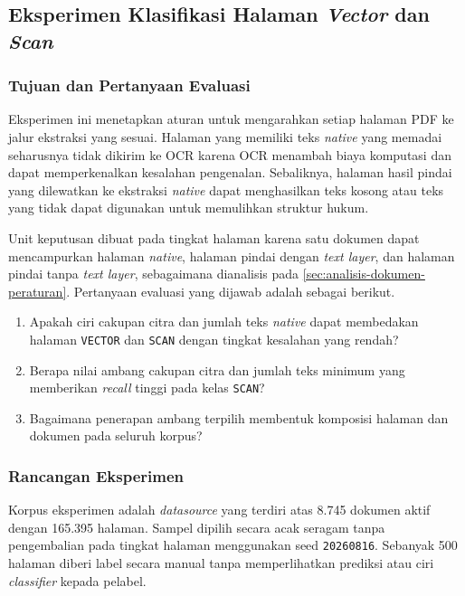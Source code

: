 \subsection{Eksperimen Klasifikasi Halaman \textit{Vector} dan \textit{Scan}}
\label{sec:eksperimen-klasifikasi-halaman}

\subsubsection{Tujuan dan Pertanyaan Evaluasi}
\label{sec:tujuan-evaluasi-klasifikasi-halaman}

Eksperimen ini menetapkan aturan untuk mengarahkan setiap halaman PDF ke jalur ekstraksi yang sesuai.
Halaman yang memiliki teks \textit{native} yang memadai seharusnya tidak dikirim ke OCR karena OCR menambah biaya komputasi dan dapat memperkenalkan kesalahan pengenalan.
Sebaliknya, halaman hasil pindai yang dilewatkan ke ekstraksi \textit{native} dapat menghasilkan teks kosong atau teks yang tidak dapat digunakan untuk memulihkan struktur hukum.

Unit keputusan dibuat pada tingkat halaman karena satu dokumen dapat mencampurkan halaman \textit{native}, halaman pindai dengan \textit{text layer}, dan halaman pindai tanpa \textit{text layer}, sebagaimana dianalisis pada \autoref{sec:analisis-dokumen-peraturan}.
Pertanyaan evaluasi yang dijawab adalah sebagai berikut.

\begin{enumerate}
  \item Apakah ciri cakupan citra dan jumlah teks \textit{native} dapat membedakan halaman \texttt{VECTOR} dan \texttt{SCAN} dengan tingkat kesalahan yang rendah?
  \item Berapa nilai ambang cakupan citra dan jumlah teks minimum yang memberikan \textit{recall} tinggi pada kelas \texttt{SCAN}?
  \item Bagaimana penerapan ambang terpilih membentuk komposisi halaman dan dokumen pada seluruh korpus?
\end{enumerate}

\subsubsection{Rancangan Eksperimen}
\label{sec:rancangan-klasifikasi-halaman}

Korpus eksperimen adalah \textit{datasource}  yang terdiri atas 8.745 dokumen aktif dengan 165.395 halaman.
Sampel dipilih secara acak seragam tanpa pengembalian pada tingkat halaman menggunakan seed \texttt{20260816}.
Sebanyak 500 halaman diberi label secara manual tanpa memperlihatkan prediksi atau ciri \textit{classifier} kepada pelabel.

